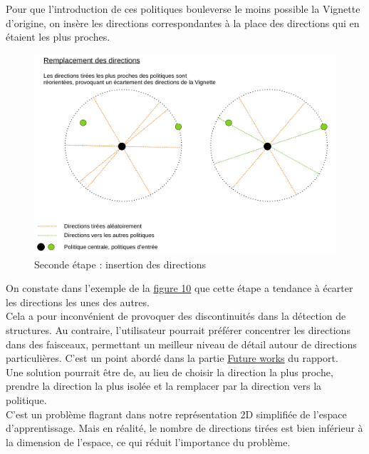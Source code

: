 \documentclass[12pt]{article}
\begin{document}
Pour que l'introduction de ces politiques bouleverse le moins possible la Vignette d'origine, on insère les directions correspondantes à la place des directions qui en étaient les plus proches. \\

\begin{figure}[htp]
    \centering
    \includegraphics[width=18cm]{Images/vignette_portee2}
    \caption{Seconde étape : insertion des directions}
    \label{fig:vignettePortee}
\end{figure}

On constate dans l'exemple de la \hyperref[fig:vignettePortee]{figure 10} que cette étape a tendance à écarter les directions les unes des autres. \\

Cela a pour inconvénient de provoquer des discontinuités dans la détection de structures. Au contraire, l'utilisateur pourrait préférer concentrer les directions dans des faisceaux, permettant un meilleur niveau de détail autour de directions particulières. C'est un point abordé dans la partie \hyperref[sec:future]{Future works} du rapport. \\

Une solution pourrait être de, au lieu de choisir la direction la plus proche, prendre la direction la plus isolée et la remplacer par la direction vers la politique. \\

C'est un problème flagrant dans notre représentation 2D simplifiée de l'espace d'apprentissage. Mais en réalité, le nombre de directions tirées est bien inférieur à la dimension de l'espace, ce qui réduit l'importance du problème. \\
\end{document}
